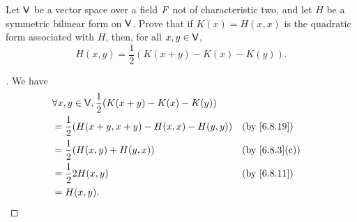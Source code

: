 \begin{ex}\label{ex:6.8.13}
\end{ex}

\begin{ex}\label{ex:6.8.16}
  Let \(\mathsf{V}\) be a vector space over a field \(\mathit{F}\) not of characteristic two, and let \(H\) be a symmetric bilinear form on \(\mathsf{V}\).
  Prove that if \(K(x) = H(x, x)\) is the quadratic form associated with \(H\), then, for all \(x, y \in \mathsf{V}\),
  \[
    H(x, y) = \frac{1}{2} (K(x + y) - K(x) - K(y)).
  \]
\end{ex}

\begin{proof}[]
  We have
  \begin{align*}
     & \forall x, y \in \V, \frac{1}{2} (K(x + y) - K(x) - K(y))                    \\
     & = \frac{1}{2} (H(x + y, x + y) - H(x, x) - H(y, y))       &  & \by{6.8.19}   \\
     & = \frac{1}{2} (H(x, y) + H(y, x))                         &  & \by{6.8.3}[c] \\
     & = \frac{1}{2} 2 H(x, y)                                   &  & \by{6.8.11}   \\
     & = H(x, y).
  \end{align*}
\end{proof}

\begin{ex}\label{ex:6.8.21}
\end{ex}
